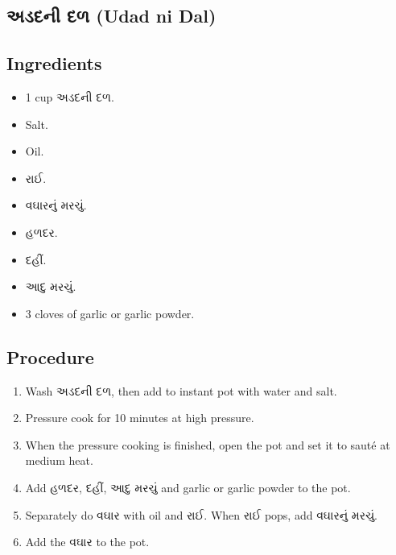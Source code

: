 \documentclass[../../recipes.tex]{subfiles}
\begin{document}
\begin{gujarati}

\chapter{અડદની દળ (Udad ni Dal)}

\section*{Ingredients}

\begin{itemize}
    \item 1 cup અડદની દળ.
    \item Salt.
    \item Oil.
    \item રાઈ.
    \item વઘારનું મરચું.
    \item હળદર.
    \item દહીં.
    \item આદુ મરચું.
    \item 3 cloves of garlic or garlic powder.
\end{itemize}

\noindent
\section*{Procedure}

\begin{enumerate}
    \item Wash અડદની દળ, then add to instant pot with water and salt.
    \item Pressure cook for 10 minutes at high pressure.
    \item When the pressure cooking is finished, open the pot and set it to sauté at medium heat.
    \item Add હળદર, દહીં, આદુ મરચું and garlic or garlic powder to the pot.
    \item Separately do વઘાર with oil and રાઈ. When રાઈ pops, add વઘારનું મરચું.
    \item Add the વઘાર to the pot.
\end{enumerate}

\end{gujarati}
\end{document}
